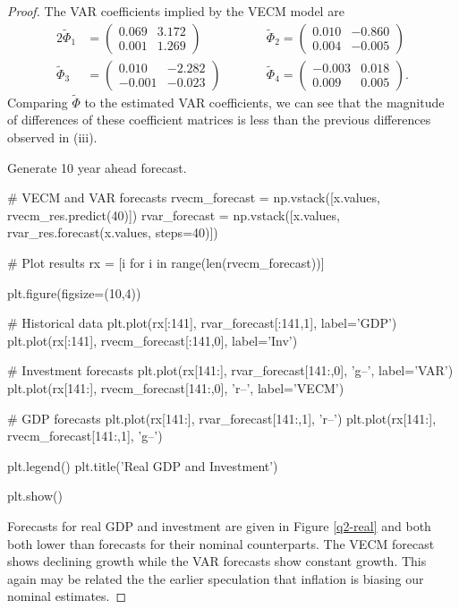 \documentclass[oneside,reqno]{amsart}
\theoremstyle{definition}
\begin{document}
\begin{enumerate}[label=(\roman*)]
\begin{proof}
The VAR coefficients implied by the VECM model are 
\begin{alignat*}{2}
	\widetilde \Phi_1 &= \begin{pmatrix}
		 0.069 &  3.172 \\
		0.001 &  1.269
	\end{pmatrix} \qquad &&
	\widetilde \Phi_2= \begin{pmatrix}
		0.010 & -0.860 \\ 
		0.004 & -0.005
	\end{pmatrix} \\
	\widetilde \Phi_3 &= \begin{pmatrix}
		 0.010 & -2.282 \\ 
		-0.001 & -0.023
	\end{pmatrix} \qquad&&
	\widetilde \Phi_4  = \begin{pmatrix}
		-0.003 & 0.018 \\
        		0.009 &  0.005
	\end{pmatrix}.
\end{alignat*}
Comparing $\widetilde \Phi$ to the estimated VAR coefficients, we can see that the magnitude of differences of these coefficient matrices is less than the previous differences observed in (iii).
\par
Generate 10 year ahead forecast. 
\begin{python3code}
# VECM and VAR forecasts
rvecm_forecast = np.vstack([x.values, rvecm_res.predict(40)])
rvar_forecast = np.vstack([x.values, rvar_res.forecast(x.values, steps=40)])

# Plot results
rx = [i for i in range(len(rvecm_forecast))]

plt.figure(figsize=(10,4))

# Historical data
plt.plot(rx[:141], rvar_forecast[:141,1],  label='GDP')
plt.plot(rx[:141], rvecm_forecast[:141,0], label='Inv')

# Investment forecasts
plt.plot(rx[141:], rvar_forecast[141:,0], 'g--', label='VAR')
plt.plot(rx[141:], rvecm_forecast[141:,0], 'r--', label='VECM')

# GDP forecasts
plt.plot(rx[141:], rvar_forecast[141:,1], 'r--')
plt.plot(rx[141:], rvecm_forecast[141:,1], 'g--')

plt.legend()
plt.title('Real GDP and Investment')

plt.show()
\end{python3code}

Forecasts for real GDP and investment are given in Figure \ref{q2-real} and both both lower than forecasts for their nominal counterparts. The VECM forecast shows declining growth while the VAR forecasts show constant growth. This again may be related the the earlier speculation that inflation is biasing our nominal estimates.


\end{proof}
\end{enumerate}
\end{document}
